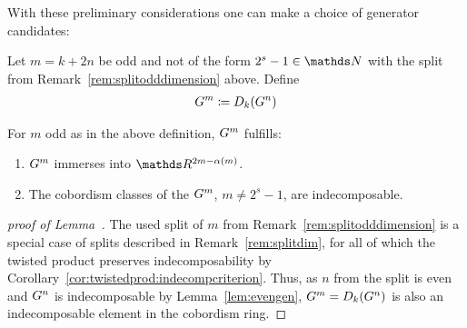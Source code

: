 With these preliminary considerations one can make a choice of
generator candidates:
\begin{Def}
  Let $m=k+2n$ be odd and not of the form $2^s-1\in\Nat$ with the
  split from Remark~\ref{rem:splitodddimension} above. Define
  \begin{gather*}
    G^{m} \coloneqq D_{k}({G^{n}})
  \end{gather*}
\end{Def}
\begin{Lem}\label{lem:oddgen}
  For $m$ odd as in the above definition, $G^{m}$ fulfills:
  \begin{enumerate}
  \item\label{item:brownimmersionproperty}
    $G^{m}$ immerses into $\R^{2m-\alpha(m)}$.
  \item\label{item:indecomposabilityproperty}
    The cobordism classes of the $G^{m}$, $m\neq 2^s-1$, are
    indecomposable.
  \end{enumerate}
\end{Lem}
\begin{proof}[proof of
  Lemma~]
  The used split of $m$ from Remark~\ref{rem:splitodddimension} is a
  special case of splits described in Remark~\ref{rem:splitdim}, for
  all of which the twisted product preserves indecomposability by
  Corollary~\ref{cor:twistedprod:indecompcriterion}.
  Thus, as $n$ from the split is even and $G^{n}$ is indecomposable by
  Lemma~\ref{lem:evengen}, $G^{m}=D_{k}({G^{n}})$ is also an
  indecomposable element in the cobordism ring.
\end{proof}
